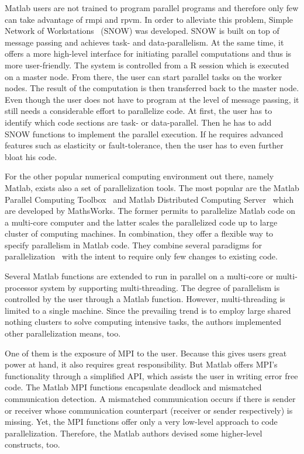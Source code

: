Matlab users are not trained to program parallel programs and therefore only few can take advantage of rmpi and rpvm.
In order to alleviate this problem, Simple Network of Workstations~\cite{tierney:pv0hros2008a} (SNOW) was developed.
SNOW is built on top of message passing and achieves task- and data-parallelism.
At the same time, it offers a more high-level interface for initiating parallel computations and thus is more user-friendly.
The system is controlled from a R session which is executed on a master node.
From there, the user can start parallel tasks on the worker nodes.
The result of the computation is then transferred back to the master node.
Even though the user does not have to program at the level of message passing, it still needs a considerable effort to parallelize code.
At first, the user has to identify which code sections are task- or data-parallel.
Then he has to add SNOW functions to implement the parallel execution.
If he requires advanced features such as elasticity or fault-tolerance, then the user has to even further bloat his code.

For the other popular numerical computing environment out there, namely Matlab, exists also a set of parallelization tools.
The most popular are the Matlab Parallel Computing Toolbox~\cite{parallelComputingToolbox} and Matlab Distributed Computing Server~\cite{distributedComputingServer} which are developed by MathsWorks.
The former permits to parallelize Matlab code on a multi-core computer and the latter scales the parallelized code up to large cluster of computing machines.
In combination, they offer a flexible way to specify parallelism in Matlab code.
They combine several paradigms for parallelization~\cite{sharma:ijpp2009a} with the intent to require only few changes to existing code.

Several Matlab functions are extended to run in parallel on a multi-core or multi-processor system by supporting multi-threading.
The degree of parallelism is controlled by the user through a Matlab function.
However, multi-threading is limited to a single machine.
Since the prevailing trend is to employ large shared nothing clusters to solve computing intensive tasks, the authors implemented other parallelization means, too.

One of them is the exposure of MPI to the user.
Because this gives users great power at hand, it also requires great responsibility.
But Matlab offers MPI's functionality through a simplified API, which assists the user in writing error free code.
The Matlab MPI functions encapsulate deadlock and mismatched communication detection.
A mismatched communication occurs if there is sender or receiver whose communication counterpart (receiver or sender respectively) is missing.
Yet, the MPI functions offer only a very low-level approach to code parallelization.
Therefore, the Matlab authors devised some higher-level constructs, too.

